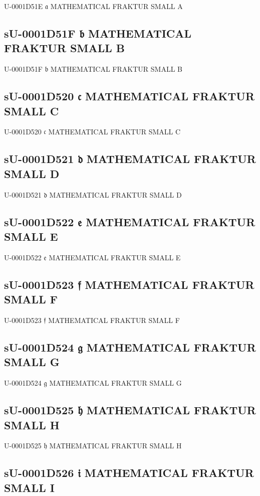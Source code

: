 U-0001D51E 𝔞 MATHEMATICAL FRAKTUR SMALL A

\subsection{sU-0001D51F 𝔟 MATHEMATICAL FRAKTUR SMALL B}

U-0001D51F 𝔟 MATHEMATICAL FRAKTUR SMALL B

\subsection{sU-0001D520 𝔠 MATHEMATICAL FRAKTUR SMALL C}

U-0001D520 𝔠 MATHEMATICAL FRAKTUR SMALL C

\subsection{sU-0001D521 𝔡 MATHEMATICAL FRAKTUR SMALL D}

U-0001D521 𝔡 MATHEMATICAL FRAKTUR SMALL D

\subsection{sU-0001D522 𝔢 MATHEMATICAL FRAKTUR SMALL E}

U-0001D522 𝔢 MATHEMATICAL FRAKTUR SMALL E

\subsection{sU-0001D523 𝔣 MATHEMATICAL FRAKTUR SMALL F}

U-0001D523 𝔣 MATHEMATICAL FRAKTUR SMALL F

\subsection{sU-0001D524 𝔤 MATHEMATICAL FRAKTUR SMALL G}

U-0001D524 𝔤 MATHEMATICAL FRAKTUR SMALL G

\subsection{sU-0001D525 𝔥 MATHEMATICAL FRAKTUR SMALL H}

U-0001D525 𝔥 MATHEMATICAL FRAKTUR SMALL H

\subsection{sU-0001D526 𝔦 MATHEMATICAL FRAKTUR SMALL I}

